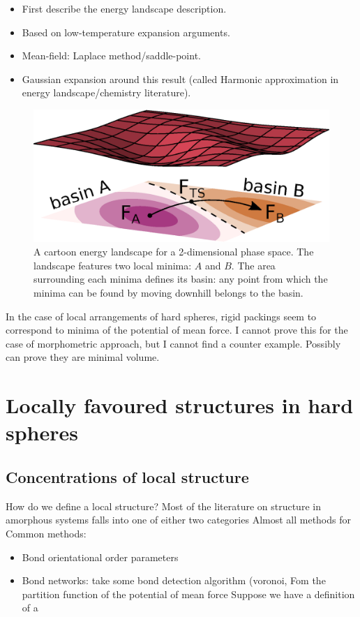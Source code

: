 \documentclass[11pt,twoside]{report}
\begin{document}
\begin{itemize}
  \item First describe the energy landscape description.
  \item Based on low-temperature expansion arguments.
  \item Mean-field: Laplace method/saddle-point.
  \item Gaussian expansion around this result (called Harmonic approximation in energy landscape/chemistry literature).
\end{itemize}

\begin{figure}
  \includegraphics[width=\linewidth]{toy-landscape}
  \caption{A cartoon energy landscape for a 2-dimensional phase space.
    The landscape features two local minima: $A$ and $B$.
    The area surrounding each minima defines its basin: any point from which the minima can be found by moving downhill belongs to the basin.}
\end{figure}

In the case of local arrangements of hard spheres, rigid packings seem to correspond to minima of the potential of mean force.
I cannot prove this for the case of morphometric approach, but I cannot find a counter example.
Possibly can prove they are minimal volume.

\section{Locally favoured structures in hard spheres}

\subsection{Concentrations of local structure}

How do we define a local structure?
Most of the literature on structure in amorphous systems falls into one of either two categories
Almost all methods for Common methods:
\begin{itemize}
  \item Bond orientational order parameters
  \item Bond networks: take some bond detection algorithm (voronoi, 
Fom the partition function of the potential of mean force
Suppose we have a definition of a
\end{itemize}
\end{document}
